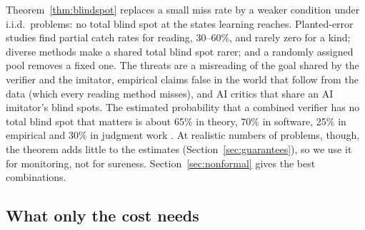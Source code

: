 \documentclass[11pt]{article}
\theoremstyle{definition}
\theoremstyle{remark}
\begin{document}
Theorem~\ref{thm:blindspot} replaces a small miss rate by a weaker condition under i.i.d.\ problems: no total blind spot at the states learning reaches. Planted-error studies find partial catch rates for reading, 30--60\%, and rarely zero for a kind; diverse methods make a shared total blind spot rarer; and a randomly assigned pool removes a fixed one. The threats are a misreading of the goal shared by the verifier and the imitator, empirical claims false in the world that follow from the data (which every reading method misses), and AI critics that share an AI imitator's blind spots. The estimated probability that a combined verifier has no total blind spot that matters is about 65\% in theory, 70\% in software, 25\% in empirical and 30\% in judgment work \cite{threadQ2}. At realistic numbers of problems, though, the theorem adds little to the estimates (Section~\ref{sec:guarantees}), so we use it for monitoring, not for sureness. Section~\ref{sec:nonformal} gives the best combinations.

\subsection{What only the cost needs}
\end{document}
